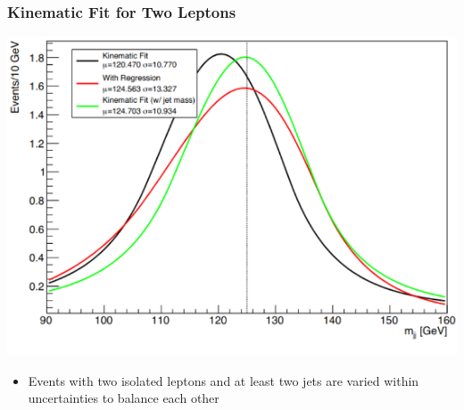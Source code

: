 \documentclass{beamer}
\begin{document}
\begin{frame}
  \frametitle{Kinematic Fit for Two Leptons}

  \begin{center}
    \includegraphics[width=0.6\linewidth]{figures/Screenshot_2020-11-30_20-55-31.png}
  \end{center}

  \begin{itemize}
  \item Events with two isolated leptons and at least two jets are varied within uncertainties to balance each other
  \end{itemize}

\end{frame}
\end{document}
